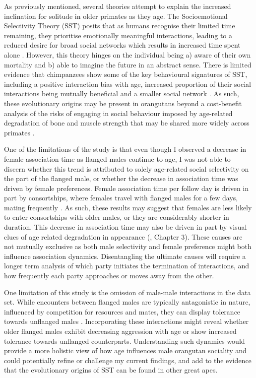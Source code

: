  As previously mentioned, several theories attempt to explain the increased inclination for solitude in older primates as they age. The Socioemotional Selectivity Theory (SST) posits that as humans recognise their limited time remaining, they prioritise emotionally meaningful interactions, leading to a reduced desire for broad social networks which results in increased time spent alone \citep{Carstensen.2021}. However, this theory hinges on the individual being a) aware of their own mortality and b) able to imagine the future in an abstract sense. There is limited evidence that chimpanzees show some of the key behavioural signatures of SST, including a positive interaction bias with age, increased proportion of their social interactions being mutually beneficial and a smaller social network \citep{Rosati.2020}. As such, these evolutionary origins may be present in orangutans beyond a cost-benefit analysis of the risks of engaging in social behaviour imposed by age-related degradation of bone and muscle strength that may be shared more widely across primates \citep{González.2023}.

One of the limitations of the study is that even though I observed a decrease in female association time as flanged males continue to age, I was not able to discern whether this trend is attributed to solely age-related social selectivity on the part of the flanged male, or whether the decrease in association time was driven by female preferences. Female association time per follow day is driven in part by consortships, where females travel with flanged males for a few days, mating frequently \citep{O'Connell.2020}. As such, these results may suggest that females are less likely to enter consortships with older males, or they are considerably shorter in duration. This decrease in association time may also be driven in part by visual clues of age related degradation in appearance (\citep{Jolly.2009}, Chapter 3). These causes are not mutually exclusive as both male selectivity and female preference might both influence association dynamics. Disentangling the ultimate causes will require a longer term analysis of which party initiates the termination of interactions, and how frequently each party approaches or moves away from the other.

One limitation of this study is the omission of male-male interactions in the data set. While encounters between flanged males are typically antagonistic in nature, influenced by competition for resources and mates, they can display tolerance towards unflanged males \citep{Setia.2008}. Incorporating these interactions might reveal whether older flanged males exhibit decreasing aggression with age or show increased tolerance towards unflanged counterparts. Understanding such dynamics would provide a more holistic view of how age influences male orangutan sociality and could potentially refine or challenge my current findings, and add to the evidence that the evolutionary origins of SST can be found in other great apes.

